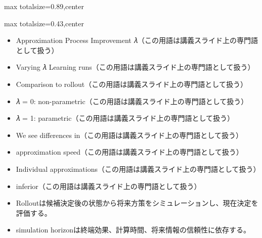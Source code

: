 \begin{minipage}[t]{0.58\textwidth}
\begin{adjustbox}{max totalsize={\textwidth}{0.89\textheight},center}
\begin{minipage}{\textwidth}
\end{minipage}
\end{adjustbox}
\end{minipage}


\clearpage
{}
\begin{minipage}[t]{0.405\textwidth}
\begin{adjustbox}{max totalsize={\textwidth}{0.43\textheight},center}
\begin{minipage}{\textwidth}\scriptsize
{}\begin{itemize}
\item Approximation Process Improvement 𝜆（この用語は講義スライド上の専門語として扱う）
\item Varying 𝜆 Learning runs（この用語は講義スライド上の専門語として扱う）
\item Comparison to rollout（この用語は講義スライド上の専門語として扱う）
\item 𝜆 = 0: non-parametric（この用語は講義スライド上の専門語として扱う）
\item 𝜆 = 1: parametric（この用語は講義スライド上の専門語として扱う）
\item We see differences in（この用語は講義スライド上の専門語として扱う）
\item approximation speed（この用語は講義スライド上の専門語として扱う）
\item Individual approximations（この用語は講義スライド上の専門語として扱う）
\item inferior（この用語は講義スライド上の専門語として扱う）
\end{itemize}\begin{itemize}
\item Rolloutは候補決定後の状態から将来方策をシミュレーションし、現在決定を評価する。
\item simulation horizonは終端効果、計算時間、将来情報の信頼性に依存する。
\end{itemize}
\end{minipage}
\end{adjustbox}
\end{minipage}\hfill
